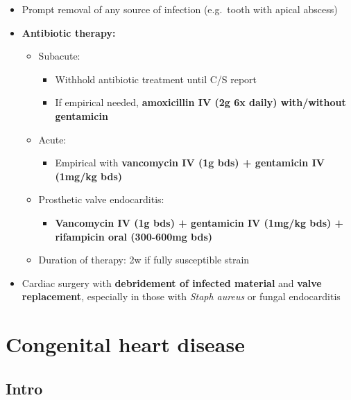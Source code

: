\documentclass[
  12pt,
]{memoir}
\providecommand{\tightlist}{%
  \setlength{\itemsep}{0pt}\setlength{\parskip}{0pt}}
\begin{document}
\begin{itemize}
\tightlist
\item
  Prompt removal of any source of infection (e.g.~tooth with apical
  abscess)
\item
  \textbf{Antibiotic therapy:}

  \begin{itemize}
  \tightlist
  \item
    Subacute:

    \begin{itemize}
    \tightlist
    \item
      Withhold antibiotic treatment until C/S report
    \item
      If empirical needed, \textbf{amoxicillin IV (2g 6x daily)
      with/without gentamicin}
    \end{itemize}
  \item
    Acute:

    \begin{itemize}
    \tightlist
    \item
      Empirical with \textbf{vancomycin IV (1g bds) + gentamicin IV
      (1mg/kg bds)}
    \end{itemize}
  \item
    Prosthetic valve endocarditis:

    \begin{itemize}
    \tightlist
    \item
      \textbf{Vancomycin IV (1g bds) + gentamicin IV (1mg/kg bds) +
      rifampicin oral (300-600mg bds)}
    \end{itemize}
  \item
    Duration of therapy: 2w if fully susceptible strain
  \end{itemize}
\item
  Cardiac surgery with \textbf{debridement of infected material} and
  \textbf{valve replacement}, especially in those with \emph{Staph
  aureus} or fungal endocarditis
\end{itemize}

\hypertarget{congenital-heart-disease}{%
\section{Congenital heart disease}\label{congenital-heart-disease}}

\hypertarget{intro-9}{%
\subsection{Intro}\label{intro-9}}
\end{document}
